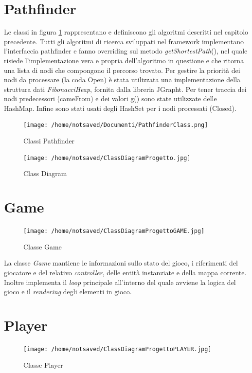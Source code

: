 \documentclass[12pt]{book}
\begin{document}
\section{Pathfinder}
\par{Le classi in figura \ref{classpathfinder} rappresentano e definiscono gli algoritmi descritti nel capitolo precedente. Tutti gli algoritmi di ricerca sviluppati nel framework implementano l'interfaccia pathfinder e fanno overriding sul metodo \emph{getShortestPath}(), nel quale risiede l'implementazione vera e propria dell'algoritmo in questione e che ritorna una lista di nodi che compongono il percorso trovato. Per gestire la priorit\`a dei nodi da processare (la coda Open) \`e stata utilizzata una implementazione della struttura dati \emph{FibonacciHeap}, fornita dalla libreria JGrapht. Per tener traccia dei nodi predecessori (cameFrom) e dei valori g() sono state utilizzate delle HashMap. Infine sono stati usati degli HashSet per i nodi processati (Closed).}
\begin{figure}[htp]
\centering
\texttt{[image: /home/notsaved/Documenti/PathfinderClass.png]}
\caption{Classi Pathfinder}
\label{classpathfinder}
\end{figure}

\iffalse\begin{figure}[htp]
\centering
\texttt{[image: /home/notsaved/ClassDiagramProgetto.jpg]}
\caption{Class Diagram}
\label{classdiagram}
\end{figure}


\section{Game}
\begin{figure}[H]
\centering
\texttt{[image: /home/notsaved/ClassDiagramProgettoGAME.jpg]}
\caption{Classe Game}
\label{clssgame}
\end{figure}
La classe \emph{Game} mantiene le informazioni sullo stato del gioco, i riferimenti del giocatore e del relativo \emph{controller}, delle entit\`a instanziate e della mappa corrente. Inoltre implementa il \emph{loop} principale all'interno del quale avviene la logica del gioco e il \emph{rendering} degli elementi in gioco.

\section{Player}
\begin{figure}[H]
\centering
\texttt{[image: /home/notsaved/ClassDiagramProgettoPLAYER.jpg]}
\caption{Classe Player}
\label{clssplyr}
\end{figure}
\end{document}
